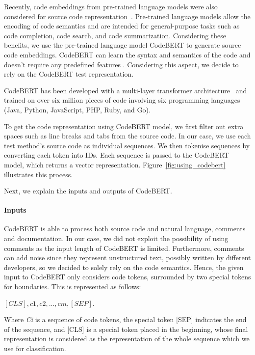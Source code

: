 Recently, code embeddings from pre-trained language models were also considered for source code representation~\cite{fatima2021flakify,zhou2021assessing}. Pre-trained language models allow the encoding of code semantics and are intended for general-purpose tasks such as code completion, code search, and code summarization.
Considering these benefits, we use the pre-trained language model CodeBERT \cite{feng-etal-2020-codebert} to generate source code embeddings. 
CodeBERT can learn the syntax and semantics of the code and doesn't require any predefined features \cite{wan2022they}. Considering this aspect, we decide to rely on the CodeBERT test representation.

CodeBERT has been developed with a multi-layer transformer architecture~\cite{transformer} and trained on over six million pieces of code involving six programming languages (Java, Python, JavaScript, PHP, Ruby, and Go). 

To get the code representation using CodeBERT model, we first filter out extra spaces such as line breaks and tabs from the source code. In our case, we use each test method's source code as individual sequences. We then tokenise sequences by converting each token into IDs. Each sequence is passed to the CodeBERT model, which returns a vector representation. Figure~\ref{fig:using_codebert} illustrates this process.

Next, we explain the inputs and outputs of CodeBERT.

\paragraph{Inputs}
CodeBERT is able to process both source code and natural language, \eg comments and documentation. In our case, we did not exploit the possibility of using comments as the input length of CodeBERT is limited. Furthermore, comments can add noise since they represent unstructured text, possibly written by different developers, so we decided to solely rely on the code semantics. 
Hence, the given input to CodeBERT only considers code tokens, surrounded by two special tokens for boundaries. This is represented as follows: 
\begin{center}
 \([CLS], c1, c2, ..., cm, [SEP]. \)
\end{center}
Where \textit{Ci} is a sequence of code tokens, the special token [SEP] indicates the end of the sequence, and [CLS] is a special token placed in the beginning, whose final representation is considered as the representation of the whole sequence which we use for classification.


